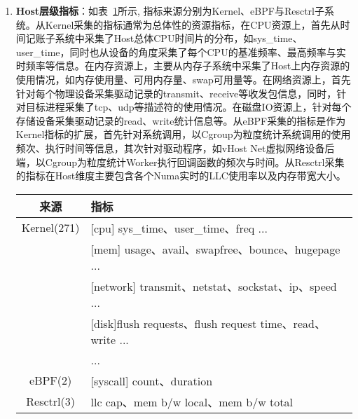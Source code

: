 \begin{enumerate}
    \item \textbf{Host层级指标}：如表~\ref{tab:host_metric}所示, 指标来源分别为Kernel、eBPF与Resctrl子系统。从Kernel采集的指标通常为总体性的资源指标，在CPU资源上，首先从时间记账子系统中采集了Host总体CPU时间片的分布，如sys\_time、user\_time，同时也从设备的角度采集了每个CPU的基准频率、最高频率与实时频率等信息。在内存资源上，主要从内存子系统中采集了Host上内存资源的使用情况，如内存使用量、可用内存量、swap可用量等。在网络资源上，首先针对每个物理设备采集驱动记录的transmit、receive等收发包信息，同时，针对目标进程采集了tcp、udp等描述符的使用情况。在磁盘IO资源上，针对每个存储设备采集驱动记录的read、write统计信息等。从eBPF采集的指标是作为Kernel指标的扩展，首先针对系统调用，以Cgroup为粒度统计系统调用的使用频次、执行时间等信息，其次针对驱动程序，如vHost Net虚拟网络设备后端，以Cgroup为粒度统计Worker执行回调函数的频次与时间。从Resctrl采集的指标在Host维度主要包含各个Numa实时的LLC使用率以及内存带宽大小。

\begin{table}[!htbp]
    \label{tab:host_metric}
    \footnotesize%
    \setlength{\tabcolsep}{4pt}%
    \renewcommand{\arraystretch}{1.25}%
    \centering
    \begin{tabular}{cl}
        \hline
        来源 & 指标\\
        \hline
        Kernel(271) & [cpu] sys\_time、user\_time、freq ... \\
        & [mem] usage、avail、swapfree、bounce、hugepage ...\\
        & [network] transmit、netstat、sockstat、ip、speed ...\\
        & [disk]flush requests、flush request time、read、write ...\\
        & ...\\
        eBPF(2) & [syscall] count、duration\\
        Resctrl(3) & llc cap、mem b/w local、mem b/w total\\
        \hline
    \end{tabular}
\end{table}


\end{enumerate}
